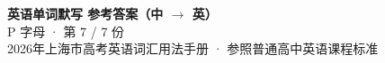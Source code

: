 \documentclass[10pt,a4paper]{article}
\begin{document}
\pagestyle{plain}

\begin{center}
{\LARGE\bfseries 英语单词默写 \quad 参考答案（中 $\to$ 英）}\\[0.22em]
{\large P 字母 · 第 7 / 7 份}\\[0.18em]
{\small 2026年上海市高考英语词汇用法手册 · 参照普通高中英语课程标准}
\end{center}

\vspace{0.2em}
\noindent{\color{rulegray}\rule{\textwidth}{0.8pt}}

\vspace{0.35em}

\vspace{0.25em}
\renewcommand{\arraystretch}{1.32}
\end{document}
